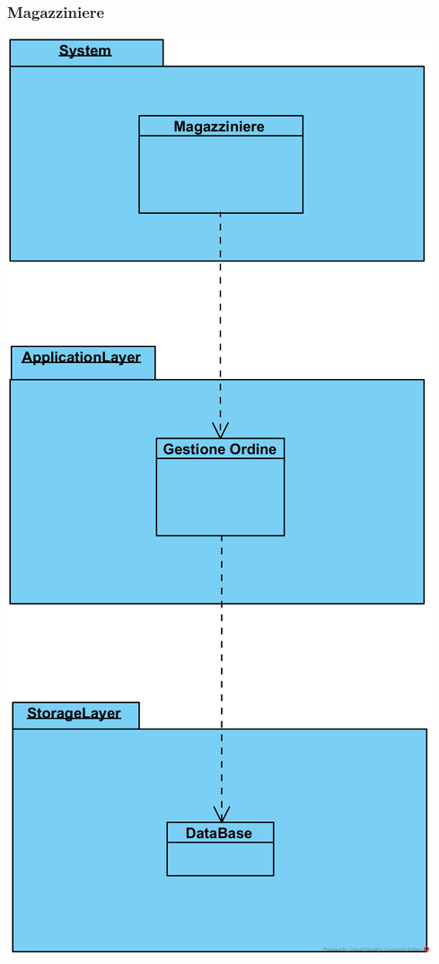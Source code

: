 \documentclass[12pt,a4paper]{article}
\begin{document}
\subsubsection{Magazziniere}
\begin{center}
\includegraphics[height=0.34\textheight]{Magazziniere}
\end{center}
\end{document}
